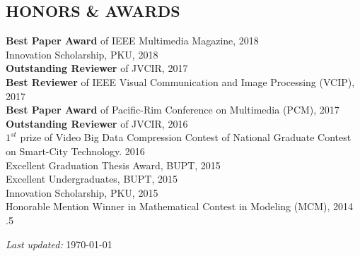 \documentclass[margin, 10pt]{res} %
\begin{document}
\begin{resume}

\section{HONORS \& AWARDS}
{\bf Best Paper Award} of IEEE Multimedia Magazine, \hfill 2018 \\
Innovation Scholarship, PKU, \hfill 2018 \\
{\bf Outstanding Reviewer} of JVCIR, \hfill 2017 \\
{\bf Best Reviewer} of IEEE Visual Communication and Image Processing (VCIP), \hfill 2017 \\
{\bf Best Paper Award} of Pacific-Rim Conference on Multimedia (PCM), \hfill 2017 \\
{\bf Outstanding Reviewer} of JVCIR, \hfill 2016 \\
{\bf ${1}^{st}$} prize of Video Big Data Compression Contest of National Graduate Contest on Smart-City Technology. \hfill 2016 \\
Excellent Graduation Thesis Award, BUPT, \hfill 2015 \\
Excellent Undergraduates, BUPT, \hfill 2015 \\
Innovation Scholarship, PKU, \hfill 2015 \\
Honorable Mention Winner in Mathematical Contest in Modeling (MCM), \hfill 2014 \\


\moveleft.5\hoffset\centerline{
\textit{Last updated:}
\today
}

\end{resume}
\end{document}

